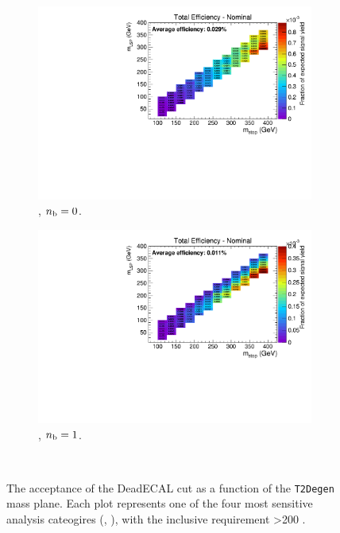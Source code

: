 \begin{figure}[h!]
\begin{subfigure}[b]{0.4\textwidth}
  \end{subfigure}\\
  \begin{subfigure}[b]{0.4\textwidth}
    \includegraphics[width=\textwidth, page=3]{Figs/sms/t2degen/v5/DeadECAL_T2_4body_v5_eq0b_ge4j_incl.pdf}
    \caption{\njhigh, $n_{\text{b}} = 0$.}
  \end{subfigure}
  \begin{subfigure}[b]{0.4\textwidth}
    \includegraphics[width=\textwidth, page=3]{Figs/sms/t2degen/v5/DeadECAL_T2_4body_v5_eq1b_ge4j_incl.pdf}
    \caption{\njhigh, $n_{\text{b}} = 1$.}
  \end{subfigure}\\
  \caption{The acceptance of the DeadECAL cut as a function of the \texttt{T2Degen}
  mass plane. Each plot represents one of the four most sensitive 
  analysis cateogires (\nb, \nj), with the inclusive requirement \HT>200 \gev.}
  \label{fig:sms-deadecal-t2degen}
\end{figure}
